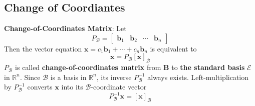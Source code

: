     \subsection{Change of Coordiantes}
    \begin{Def}\label{4-1}
        \textbf{Change-of-Coordinates Matrix}: Let
        \begin{equation*}
            P_{\mathcal{B}} = \begin{bmatrix}
                \mathbf{b}_1 & \mathbf{b}_2 & \cdots & \mathbf{b}_n
            \end{bmatrix}
        \end{equation*}
        Then the vector equation $\mathbf{x} = c_1\mathbf{b}_1 + \cdots  + c_n\mathbf{b}_n$ is equivalent to
        \begin{equation*}
            \mathbf{x} = P_{\mathcal{B}}[\mathbf{x}]_{\mathcal{B}}
        \end{equation*}
        $P_{\mathcal{B}}$ is called \textbf{change-of-coordinates matrix} from $\mathbf{B}$ to \textbf{the standard basis} $\mathcal{E}$ in $\mathbb{R}^n$. Since $\mathcal{B}$ is a basis in $\mathbb{R}^n$, its inverse $P_{\mathcal{B}}^{-1}$ always exists. Left-multiplication by $P_{\mathcal{B}}^{-1}$ converts $\mathbf{x}$ into its $\mathcal{B}$-coordinate vector
        \begin{equation*}
            P_{\mathcal{B}}^{-1}\mathbf{x} = [\mathbf{x}]_{\mathcal{B}}
        \end{equation*}
    \end{Def}



